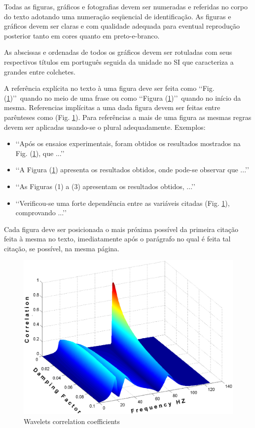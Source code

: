 Todas as figuras, gráficos e fotografias devem ser numeradas e referidas no
corpo do texto adotando uma numeração seqüencial de identificação. As figuras e
gráficos devem ser claras e com qualidade adequada para eventual reprodução
posterior tanto em cores quanto em preto-e-branco.

As abscissas e ordenadas de todos os gráficos devem ser rotuladas com seus
respectivos títulos em português seguida da unidade no SI que caracteriza a
grandes entre colchetes.

A referência explícita no texto à uma figura deve ser feita como
\lq\lq Fig. (\ref{fig01})\rq\rq\ quando no meio de uma frase ou como
\lq\lq Figura (\ref{fig01})\rq\rq\ quando no início da mesma. Referencias
implícitas a uma dada figura devem ser feitas entre parênteses como
(Fig. \ref{fig01}). Para referências a mais de uma figura as mesmas regras
devem ser aplicadas usando-se o plural adequadamente. Exemplos:

\begin{itemize}
	\item \lq\lq Após os ensaios experimentais, foram obtidos os resultados
	mostrados na Fig. (\ref{fig01}), que ...\rq\rq
	\item \lq\lq A Figura (\ref{fig01}) apresenta os resultados obtidos, onde
	pode-se observar que ...\rq\rq
	\item \lq\lq As Figuras (1) a (3) apresentam os resultados obtidos,
	...\rq\rq
	\item \lq\lq Verificou-se uma forte dependência entre as variáveis citadas
	(Fig. \ref{fig01}), comprovando ...\rq\rq
\end{itemize}

Cada figura deve ser posicionada o mais próxima possível da primeira citação
feita à mesma no texto, imediatamente após o parágrafo no qual é feita tal
citação, se possível, na mesma página.
\begin{figure}[h]
	\centering
	\label{fig01}
		\includegraphics[keepaspectratio=true,scale=0.3]{figuras/fig01.eps}
	\caption{Wavelets correlation coefficients}
\end{figure}

